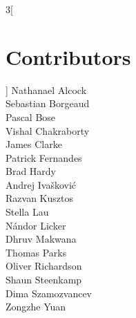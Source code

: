\thispagestyle{plain}
\begin{multicols}{3}[\section*{Contributors}]
Nathanael Alcock\\
Sebastian Borgeaud\\
Pascal Bose\\
Vishal Chakraborty\\
James Clarke\\
Patrick Fernandes\\
Brad Hardy\\
Andrej Ivašković\\
Razvan Kusztos\\
Stella Lau\\
Nándor Licker\\
Dhruv Makwana\\
Thomas Parks\\
Oliver Richardson\\
Shaun Steenkamp\\
Dima Szamozvancev\\
Zongzhe Yuan\\
\end{multicols}
\clearpage


\tableofcontents

\newpage



























